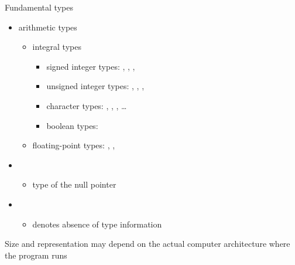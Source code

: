 \begin{frame}{Fundamental types}
  \begin{itemize}
    \item arithmetic types
      \begin{itemize}
        \item integral types
          \begin{itemize}
          \item signed integer types: , \alert<3->{},
            , 
          \item unsigned integer types: ,
            , , 
          \item character types: \alert<3->{}, ,
            , \ldots
          \item boolean types: \alert<3->{}
          \end{itemize}
        \item floating-point types: , \alert<3->{}, 
      \end{itemize}
    \item {}
      \begin{itemize}
      \item type of the null pointer 
      \end{itemize}
    \item {}
      \begin{itemize}
      \item denotes absence of type information
      \end{itemize}
  \end{itemize}

  \pause

  Size and representation may depend on the actual computer architecture where
  the program runs

\end{frame}

